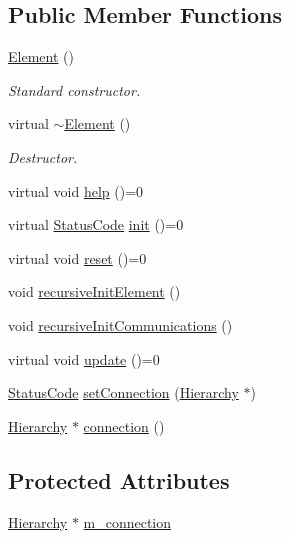 \subsection*{Public Member Functions}
\begin{DoxyCompactItemize}
\item 
\hyperlink{classElement_ab0d0e20be9a36ae676202db753faeec9}{Element} ()
\begin{DoxyCompactList}\small\item\em Standard constructor. \end{DoxyCompactList}\item 
virtual \hyperlink{classElement_a13d54ba9c08b6bec651402f1c2bb002c}{$\sim$\+Element} ()
\begin{DoxyCompactList}\small\item\em Destructor. \end{DoxyCompactList}\item 
virtual void \hyperlink{classElement_a32c0de27acb08e17251cef88c3e9303a}{help} ()=0
\item 
virtual \hyperlink{classStatusCode}{Status\+Code} \hyperlink{classElement_af42754b5cabc198869222725218d695c}{init} ()=0
\item 
virtual void \hyperlink{classElement_a69efffa22f06909d768149715565cb56}{reset} ()=0
\item 
void \hyperlink{classElement_a3c0abcb36f8906688bb7e32608df7086}{recursive\+Init\+Element} ()
\item 
void \hyperlink{classElement_a82119ed37dff76508a2746a853ec35ba}{recursive\+Init\+Communications} ()
\item 
virtual void \hyperlink{classElement_a4e6c83efae95616ebddd03c793a26661}{update} ()=0
\item 
\hyperlink{classStatusCode}{Status\+Code} \hyperlink{classElement_ab476b4b1df5954141ceb14f072433b89}{set\+Connection} (\hyperlink{classHierarchy}{Hierarchy} $\ast$)
\item 
\hyperlink{classHierarchy}{Hierarchy} $\ast$ \hyperlink{classElement_af57444353c1ddf9fa0109801e97debf7}{connection} ()
\end{DoxyCompactItemize}
\subsection*{Protected Attributes}
\begin{DoxyCompactItemize}
\item 
\hyperlink{classHierarchy}{Hierarchy} $\ast$ \hyperlink{classElement_abe3de7a5dbbc9a6dd2d7e012e5fdb266}{m\+\_\+connection}
\end{DoxyCompactItemize}

